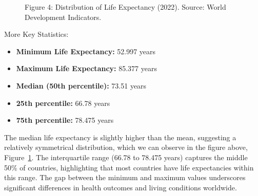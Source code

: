 \documentclass[
]{article}
\providecommand{\tightlist}{%
  \setlength{\itemsep}{0pt}\setlength{\parskip}{0pt}}\usepackage{longtable,booktabs,array}
\begin{document}
\begin{figure}


\caption{\label{fig-life-expectancy-histogram}Figure 4: Distribution of
Life Expectancy (2022). Source: World Development Indicators.}

\end{figure}%

More Key Statistics:

\begin{itemize}
\tightlist
\item
  \textbf{Minimum Life Expectancy:} 52.997 years
\item
  \textbf{Maximum Life Expectancy:} 85.377 years
\item
  \textbf{Median (50th percentile):} 73.51 years
\item
  \textbf{25th percentile:} 66.78 years
\item
  \textbf{75th percentile:} 78.475 years
\end{itemize}

The median life expectancy is slightly higher than the mean, suggesting
a relatively symmetrical distribution, which we can observe in the
figure above, Figure~\ref{fig-life-expectancy-histogram}. The
interquartile range (66.78 to 78.475 years) captures the middle 50\% of
countries, highlighting that most countries have life expectancies
within this range. The gap between the minimum and maximum values
underscores significant differences in health outcomes and living
conditions worldwide.
\end{document}
